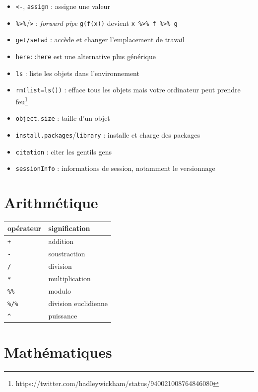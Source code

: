 \documentclass[
  letterpaper,
  DIV=11,
  numbers=noendperiod]{scrreprt}
\providecommand{\tightlist}{%
  \setlength{\itemsep}{0pt}\setlength{\parskip}{0pt}}\usepackage{longtable,booktabs,array}
\begin{document}
\begin{itemize}
\tightlist
\item
  \texttt{\textless{}-}, \texttt{assign} : assigne une valeur
\item
  \texttt{\%\textgreater{}\%}/\texttt{\textbar{}\textgreater{}} :
  \emph{forward pipe} \texttt{g(f(x))} devient
  \texttt{x\ \%\textgreater{}\%\ f\ \%\textgreater{}\%\ g}
\item
  \texttt{get/setwd} : accède et changer l'emplacement de travail
\item
  \texttt{here::here} est une alternative plus générique
\item
  \texttt{ls} : liste les objets dans l'environnement
\item
  \texttt{rm(list=ls())} : efface tous les objets mais votre ordinateur
  peut prendre feu\footnote{https://twitter.com/hadleywickham/status/940021008764846080}
\item
  \texttt{object.size} : taille d'un objet
\item
  \texttt{install.packages}/\texttt{library} : installe et charge des
  packages
\item
  \texttt{citation} : citer les gentils gens
\item
  \texttt{sessionInfo} : informations de session, notamment le
  versionnage
\end{itemize}

\hypertarget{arithmuxe9tique-1}{%
\section{Arithmétique}\label{arithmuxe9tique-1}}

\begin{longtable}[]{@{}ll@{}}
\toprule\noalign{}
opérateur & signification \\
\midrule\noalign{}
\endhead
\bottomrule\noalign{}
\endlastfoot
\texttt{+} & addition \\
\texttt{-} & soustraction \\
\texttt{/} & division \\
\texttt{*} & multiplication \\
\texttt{\%\%} & modulo \\
\texttt{\%/\%} & division euclidienne \\
\texttt{\^{}} & puissance \\
\end{longtable}

\hypertarget{mathuxe9matiques}{%
\section{Mathématiques}\label{mathuxe9matiques}}
\end{document}
